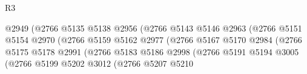 \begin{lexlean}{R3}
\begin{coremodule}
                                                  @2949
                                                  (@2766
                                                    @5135
                                                    @5138
                                                    @2956
                                                    (@2766
                                                      @5143
                                                      @5146
                                                      @2963
                                                      (@2766
                                                        @5151
                                                        @5154
                                                        @2970
                                                        (@2766
                                                          @5159
                                                          @5162
                                                          @2977
                                                          (@2766
                                                            @5167
                                                            @5170
                                                            @2984
                                                            (@2766
                                                              @5175
                                                              @5178
                                                              @2991
                                                              (@2766
                                                                @5183
                                                                @5186
                                                                @2998
                                                                (@2766
                                                                  @5191
                                                                  @5194
                                                                  @3005
                                                                  (@2766
                                                                    @5199
                                                                    @5202
                                                                    @3012
                                                                    (@2766
                                                                      @5207
                                                                      @5210

\end{coremodule}
\end{lexlean}
